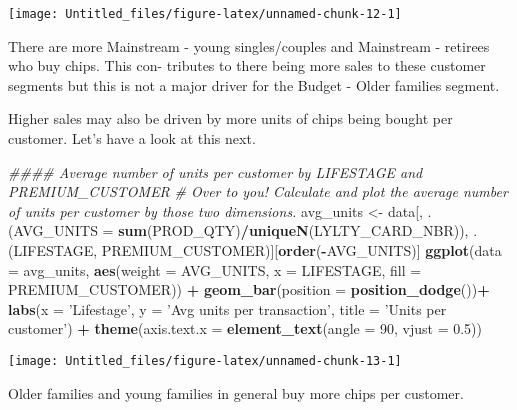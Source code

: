 \documentclass[]{article}
\newenvironment{Shaded}{\begin{snugshade}}{\end{snugshade}}
\newcommand{\CommentTok}[1]{\textcolor[rgb]{0.56,0.35,0.01}{\textit{#1}}}
\newcommand{\DataTypeTok}[1]{\textcolor[rgb]{0.13,0.29,0.53}{#1}}
\newcommand{\DecValTok}[1]{\textcolor[rgb]{0.00,0.00,0.81}{#1}}
\newcommand{\FloatTok}[1]{\textcolor[rgb]{0.00,0.00,0.81}{#1}}
\newcommand{\KeywordTok}[1]{\textcolor[rgb]{0.13,0.29,0.53}{\textbf{#1}}}
\newcommand{\NormalTok}[1]{#1}
\newcommand{\OperatorTok}[1]{\textcolor[rgb]{0.81,0.36,0.00}{\textbf{#1}}}
\newcommand{\StringTok}[1]{\textcolor[rgb]{0.31,0.60,0.02}{#1}}
\begin{document}
\begin{center}\texttt{[image: Untitled\_files/figure-latex/unnamed-chunk-12-1]} \end{center}

There are more Mainstream - young singles/couples and Mainstream -
retirees who buy chips. This con- tributes to there being more sales to
these customer segments but this is not a major driver for the Budget -
Older families segment.

Higher sales may also be driven by more units of chips being bought per
customer. Let's have a look at this next.

\begin{Shaded}
\begin{Highlighting}[]
\CommentTok{#### Average number of units per customer by LIFESTAGE and PREMIUM_CUSTOMER}
\CommentTok{# Over to you! Calculate and plot the average number of units per customer by those two dimensions.}
\NormalTok{avg_units <-}\StringTok{ }\NormalTok{data[, .(}\DataTypeTok{AVG_UNITS =} \KeywordTok{sum}\NormalTok{(PROD_QTY)}\OperatorTok{/}\KeywordTok{uniqueN}\NormalTok{(LYLTY_CARD_NBR)),}
\NormalTok{                  .(LIFESTAGE, PREMIUM_CUSTOMER)][}\KeywordTok{order}\NormalTok{(}\OperatorTok{-}\NormalTok{AVG_UNITS)]}
\KeywordTok{ggplot}\NormalTok{(}\DataTypeTok{data =}\NormalTok{ avg_units, }
            \KeywordTok{aes}\NormalTok{(}\DataTypeTok{weight =}\NormalTok{ AVG_UNITS, }\DataTypeTok{x =}\NormalTok{ LIFESTAGE, }\DataTypeTok{fill =}\NormalTok{ PREMIUM_CUSTOMER)) }\OperatorTok{+}
\StringTok{  }\KeywordTok{geom_bar}\NormalTok{(}\DataTypeTok{position =} \KeywordTok{position_dodge}\NormalTok{())}\OperatorTok{+}
\StringTok{  }\KeywordTok{labs}\NormalTok{(}\DataTypeTok{x =} \StringTok{'Lifestage'}\NormalTok{, }\DataTypeTok{y =} \StringTok{'Avg units per transaction'}\NormalTok{, }
       \DataTypeTok{title =} \StringTok{'Units per customer'}\NormalTok{) }\OperatorTok{+}
\StringTok{  }\KeywordTok{theme}\NormalTok{(}\DataTypeTok{axis.text.x =} \KeywordTok{element_text}\NormalTok{(}\DataTypeTok{angle =} \DecValTok{90}\NormalTok{, }\DataTypeTok{vjust =} \FloatTok{0.5}\NormalTok{))}
\end{Highlighting}
\end{Shaded}

\begin{center}\texttt{[image: Untitled\_files/figure-latex/unnamed-chunk-13-1]} \end{center}

Older families and young families in general buy more chips per
customer.
\end{document}
